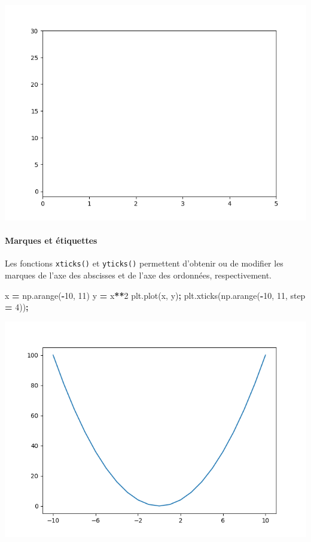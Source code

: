 \documentclass[
  12pt,
]{book}
\newenvironment{Shaded}{\begin{snugshade}}{\end{snugshade}}
\newcommand{\DecValTok}[1]{\textcolor[rgb]{0.00,0.00,0.81}{#1}}
\newcommand{\NormalTok}[1]{#1}
\newcommand{\OperatorTok}[1]{\textcolor[rgb]{0.81,0.36,0.00}{\textbf{#1}}}
\numberwithin{equation}{section}
\numberwithin{countremarque}{section}
\begin{document}
\begin{center}\includegraphics[width=9.03in]{figs/pyplot/plot_axes_limites} \end{center}

\paragraph{Marques et étiquettes}\label{marques-et-uxe9tiquettes}

Les fonctions \texttt{xticks()} et \texttt{yticks()} permettent d'obtenir ou de modifier les marques de l'axe des abscisses et de l'axe des ordonnées, respectivement.

\begin{Shaded}
\begin{Highlighting}[]
\NormalTok{x }\OperatorTok{=}\NormalTok{ np.arange(}\OperatorTok{{-}}\DecValTok{10}\NormalTok{, }\DecValTok{11}\NormalTok{)}
\NormalTok{y }\OperatorTok{=}\NormalTok{ x}\OperatorTok{**}\DecValTok{2}
\NormalTok{plt.plot(x, y)}\OperatorTok{;}
\NormalTok{plt.xticks(np.arange(}\OperatorTok{{-}}\DecValTok{10}\NormalTok{, }\DecValTok{11}\NormalTok{, step }\OperatorTok{=} \DecValTok{4}\NormalTok{))}\OperatorTok{;}
\end{Highlighting}
\end{Shaded}

\begin{center}\includegraphics[width=9.03in]{figs/pyplot/plot_ticks} \end{center}
\end{document}
